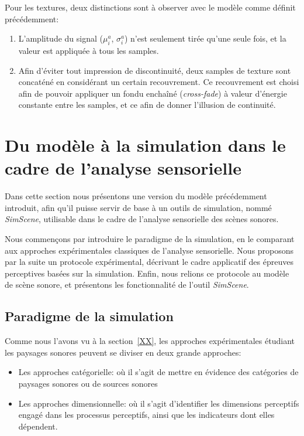 Pour les textures, deux distinctions sont à observer avec le modèle comme définit précédemment: 

\begin{enumerate}
\item L'amplitude du signal ($\mu^a_i$,  $\sigma^a_i$) n'est seulement tirée qu'une seule fois, et la valeur est appliquée à tous les samples.
\item Afin d'éviter tout impression de discontinuité, deux samples de texture sont concaténé en considérant un certain recouvrement. Ce recouvrement est choisi afin de pouvoir appliquer un fondu enchaîné (\emph{cross-fade}) à valeur d'énergie constante entre les samples, et ce afin de donner l'illusion de continuité.
\end{enumerate}


\section{Du modèle à la simulation dans le cadre de l'analyse sensorielle}
\label{sec:ch4_modAnaSo}

Dans cette section nous présentons une version du modèle précédemment introduit, afin qu'il puisse servir de base à  un outils de simulation, nommé \emph{SimScene}, utilisable dans le cadre de l'analyse sensorielle des scènes sonores.

Nous commençons par introduire le paradigme de la simulation, en le comparant aux approches expérimentales classiques  de  l'analyse sensorielle. Nous proposons par la suite un protocole expérimental, décrivant le cadre applicatif des épreuves perceptives basées sur la simulation. Enfin, nous relions ce protocole au modèle de scène sonore, et présentons les fonctionnalité de l'outil \emph{SimScene}.

\subsection{Paradigme de la simulation}

Comme nous l'avons vu à la section~\ref{XX}, les approches expérimentales étudiant les paysages sonores peuvent se diviser en deux grande approches:

\begin{itemize}
\item Les approches catégorielle: où il s'agit de mettre en évidence des catégories de paysages sonores ou de sources sonores
\item Les approches dimensionnelle: où il s'agit d'identifier les dimensions perceptifs engagé dans les processus perceptifs, ainsi que les indicateurs dont elles dépendent.
\end{itemize}

